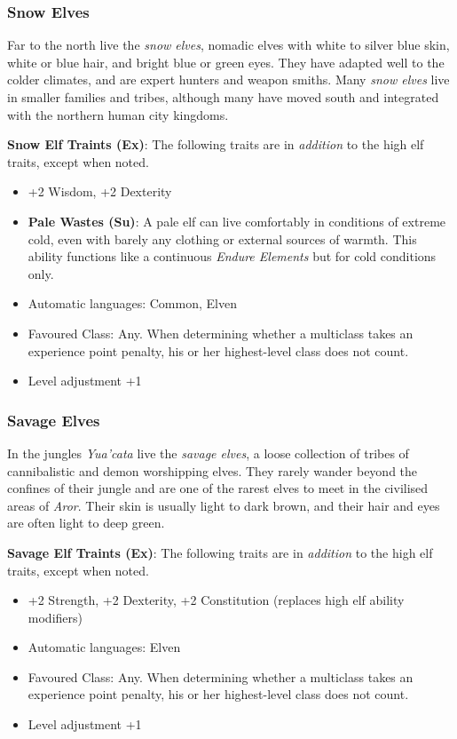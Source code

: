 \subsubsection*{Snow Elves}


Far to the north live the \emph{snow elves}, nomadic elves with white to silver
blue skin, white or blue hair, and bright blue or green eyes. They have adapted
well to the colder climates, and are expert hunters and weapon smiths. Many
\emph{snow elves} live in smaller families and tribes, although many have moved
south and integrated with the northern human city kingdoms.

\begin{35e}
  \textbf{Snow Elf Traints (Ex)}: The following traits are in \emph{addition}
  to the high elf traits, except when noted.
  \begin{itemize}[noitemsep]
    \item +2 Wisdom, +2 Dexterity
    \item \textbf{Pale Wastes (Su)}: A pale elf can live comfortably in
    conditions of extreme cold, even with barely any clothing or external
    sources of warmth. This ability functions like a continuous \emph{Endure
    Elements} but for cold conditions only.
    \item Automatic languages: Common, Elven
    \item Favoured Class: Any. When determining whether a multiclass takes an
    experience point penalty, his or her highest-level class does not count.
    \item Level adjustment +1
  \end{itemize}
\end{35e}

\subsubsection*{Savage Elves}

In the jungles \emph{Yua'cata} live the \emph{savage elves}, a loose
collection of tribes of cannibalistic and demon worshipping elves. They rarely
wander beyond the confines of their jungle and are one of the rarest elves to
meet in the civilised areas of \emph{Aror}. Their skin is usually light to dark
brown, and their hair and eyes are often light to deep green.

\begin{35e}
  \textbf{Savage Elf Traints (Ex)}: The following traits are in \emph{addition}
  to the high elf traits, except when noted.
  \begin{itemize}[noitemsep]
    \item +2 Strength, +2 Dexterity, +2 Constitution (replaces high elf ability
    modifiers)
    \item Automatic languages: Elven
    \item Favoured Class: Any. When determining whether a multiclass takes an
    experience point penalty, his or her highest-level class does not count.
    \item Level adjustment +1
  \end{itemize}
\end{35e}

